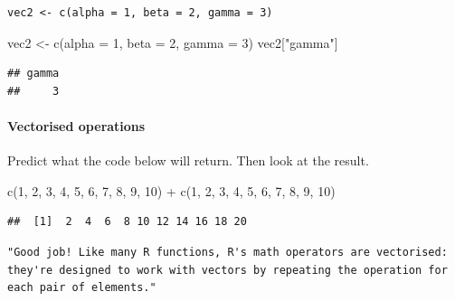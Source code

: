 \documentclass[
]{article}
\newenvironment{Shaded}{\begin{snugshade}}{\end{snugshade}}
\newcommand{\AttributeTok}[1]{\textcolor[rgb]{0.77,0.63,0.00}{#1}}
\newcommand{\DecValTok}[1]{\textcolor[rgb]{0.00,0.00,0.81}{#1}}
\newcommand{\FunctionTok}[1]{\textcolor[rgb]{0.00,0.00,0.00}{#1}}
\newcommand{\NormalTok}[1]{#1}
\newcommand{\OtherTok}[1]{\textcolor[rgb]{0.56,0.35,0.01}{#1}}
\newcommand{\SpecialCharTok}[1]{\textcolor[rgb]{0.00,0.00,0.00}{#1}}
\newcommand{\StringTok}[1]{\textcolor[rgb]{0.31,0.60,0.02}{#1}}
\begin{document}
\begin{verbatim}
vec2 <- c(alpha = 1, beta = 2, gamma = 3)
\end{verbatim}

\begin{Shaded}
\begin{Highlighting}[]
\NormalTok{vec2 }\OtherTok{\textless{}{-}} \FunctionTok{c}\NormalTok{(}\AttributeTok{alpha =} \DecValTok{1}\NormalTok{, }\AttributeTok{beta =} \DecValTok{2}\NormalTok{, }\AttributeTok{gamma =} \DecValTok{3}\NormalTok{)}
\NormalTok{vec2[}\StringTok{"gamma"}\NormalTok{]}
\end{Highlighting}
\end{Shaded}

\begin{verbatim}
## gamma 
##     3
\end{verbatim}

\hypertarget{vectorised-operations}{%
\paragraph{Vectorised operations}\label{vectorised-operations}}

Predict what the code below will return. Then look at the result.

\begin{Shaded}
\begin{Highlighting}[]
\FunctionTok{c}\NormalTok{(}\DecValTok{1}\NormalTok{, }\DecValTok{2}\NormalTok{, }\DecValTok{3}\NormalTok{, }\DecValTok{4}\NormalTok{, }\DecValTok{5}\NormalTok{, }\DecValTok{6}\NormalTok{, }\DecValTok{7}\NormalTok{, }\DecValTok{8}\NormalTok{, }\DecValTok{9}\NormalTok{, }\DecValTok{10}\NormalTok{) }\SpecialCharTok{+} \FunctionTok{c}\NormalTok{(}\DecValTok{1}\NormalTok{, }\DecValTok{2}\NormalTok{, }\DecValTok{3}\NormalTok{, }\DecValTok{4}\NormalTok{, }\DecValTok{5}\NormalTok{, }\DecValTok{6}\NormalTok{, }\DecValTok{7}\NormalTok{, }\DecValTok{8}\NormalTok{, }\DecValTok{9}\NormalTok{, }\DecValTok{10}\NormalTok{)}
\end{Highlighting}
\end{Shaded}

\begin{verbatim}
##  [1]  2  4  6  8 10 12 14 16 18 20
\end{verbatim}

\begin{verbatim}
"Good job! Like many R functions, R's math operators are vectorised: they're designed to work with vectors by repeating the operation for each pair of elements."
\end{verbatim}
\end{document}
